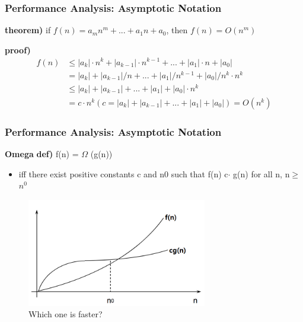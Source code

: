 \documentclass[newPxFont,sthlmFooter,nooffset]{beamer}
\begin{document}
\begin{frame}[t]
  \frametitle{Performance Analysis: Asymptotic Notation}
\textbf{theorem)} if $f(n) = a_{m}n^m + ... + a_1n + a_0$, then $f(n) = O(n^m)$

\textbf{proof)}
\begin{align*}
f(n) &\leq  |a_k|·n^k + |a_{k-1}|·n^{k-1} +...+ |a_1|\cdot n + |a_0| \\
& = {|a_k| + |a_{k-1}|/n +...+ |a_1|/n^{k-1}+ |a_0|/n^k}\cdot n^k \\
& \leq  {|a_k| + |a_{k-1}| +...+ |a_1| + |a_0|}\cdot n^k \\
& = c\cdot n^k (c = |a_k|+|a_{k-1}|+...+|a_1|+|a_0|) = O(n^k)
\end{align*}
\end{frame}
\begin{frame}[t]
	\frametitle{Performance Analysis: Asymptotic Notation}
	\textbf{Omega}
	\textbf{def)} f(n) = $\Omega$ (g(n))
	\begin{itemize}
		\item iff there exist positive constants c and n0 such that f(n)
		c$\cdot$ g(n) for all n, n$\geq$ $n^0$
	\end{itemize}
	\begin{figure}[h]
		\centering
		\includegraphics[width=0.7\textwidth]{figures/fig05_omega.png}
		\caption{Which one is faster?}
	\end{figure}
\end{frame}
\end{document}
